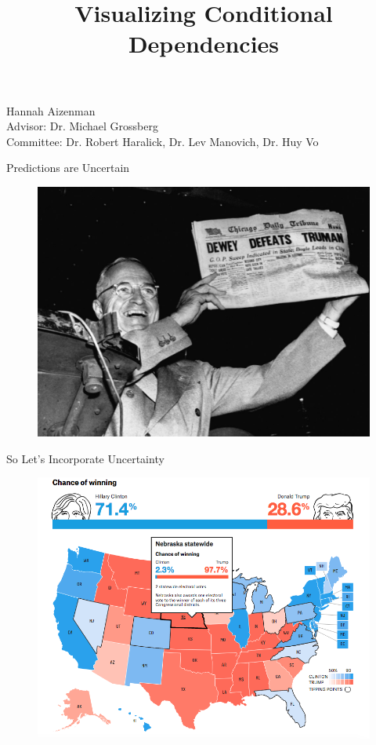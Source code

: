 \documentclass[xcolor={dvipsnames}]{beamer}
\begin{document}
\title{Visualizing Conditional Dependencies}

\begin{frame}
	\titlepage
    Hannah Aizenman\\
    Advisor: Dr. Michael Grossberg \\
    Committee: Dr. Robert Haralick, Dr. Lev Manovich, Dr. Huy Vo\\
\end{frame}

\begin{frame}{Predictions are Uncertain}
\begin{figure}
\includegraphics[width=\textwidth]{figs/gettyimages-517387760.jpg}
\end{figure}
\end{frame}

\begin{frame}{So Let's Incorporate Uncertainty}
\begin{figure}
\includegraphics[width=\textwidth]{figs/fivethirtyeight.png}
\end{figure}
\end{frame}
\end{document}
